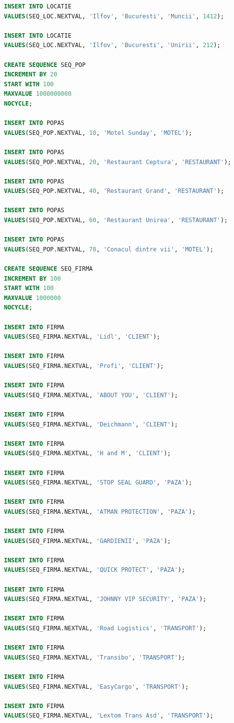 \documentclass[12pt, a4paper]{article}
\begin{document}
\begin{lstlisting}[language=SQL]
INSERT INTO LOCATIE
VALUES(SEQ_LOC.NEXTVAL, 'Ilfov', 'Bucuresti', 'Muncii', 1412);

INSERT INTO LOCATIE
VALUES(SEQ_LOC.NEXTVAL, 'Ilfov', 'Bucuresti', 'Unirii', 212);

CREATE SEQUENCE SEQ_POP
INCREMENT BY 20
START WITH 100
MAXVALUE 1000000000
NOCYCLE;

INSERT INTO POPAS
VALUES(SEQ_POP.NEXTVAL, 10, 'Motel Sunday', 'MOTEL');

INSERT INTO POPAS
VALUES(SEQ_POP.NEXTVAL, 20, 'Restaurant Ceptura', 'RESTAURANT');

INSERT INTO POPAS
VALUES(SEQ_POP.NEXTVAL, 40, 'Restaurant Grand', 'RESTAURANT');

INSERT INTO POPAS
VALUES(SEQ_POP.NEXTVAL, 60, 'Restaurant Unirea', 'RESTAURANT');

INSERT INTO POPAS
VALUES(SEQ_POP.NEXTVAL, 70, 'Conacul dintre vii', 'MOTEL');

CREATE SEQUENCE SEQ_FIRMA
INCREMENT BY 100
START WITH 100
MAXVALUE 1000000
NOCYCLE;

INSERT INTO FIRMA
VALUES(SEQ_FIRMA.NEXTVAL, 'Lidl', 'CLIENT');

INSERT INTO FIRMA
VALUES(SEQ_FIRMA.NEXTVAL, 'Profi', 'CLIENT');

INSERT INTO FIRMA
VALUES(SEQ_FIRMA.NEXTVAL, 'ABOUT YOU', 'CLIENT');

INSERT INTO FIRMA
VALUES(SEQ_FIRMA.NEXTVAL, 'Deichmann', 'CLIENT');

INSERT INTO FIRMA
VALUES(SEQ_FIRMA.NEXTVAL, 'H and M', 'CLIENT');

INSERT INTO FIRMA
VALUES(SEQ_FIRMA.NEXTVAL, 'STOP SEAL GUARD', 'PAZA');

INSERT INTO FIRMA
VALUES(SEQ_FIRMA.NEXTVAL, 'ATMAN PROTECTION', 'PAZA');

INSERT INTO FIRMA
VALUES(SEQ_FIRMA.NEXTVAL, 'GARDIENII', 'PAZA');

INSERT INTO FIRMA
VALUES(SEQ_FIRMA.NEXTVAL, 'QUICK PROTECT', 'PAZA');

INSERT INTO FIRMA
VALUES(SEQ_FIRMA.NEXTVAL, 'JOHNNY VIP SECURITY', 'PAZA');

INSERT INTO FIRMA
VALUES(SEQ_FIRMA.NEXTVAL, 'Road Logistics', 'TRANSPORT');

INSERT INTO FIRMA
VALUES(SEQ_FIRMA.NEXTVAL, 'Transibo', 'TRANSPORT');

INSERT INTO FIRMA
VALUES(SEQ_FIRMA.NEXTVAL, 'EasyCargo', 'TRANSPORT');

INSERT INTO FIRMA
VALUES(SEQ_FIRMA.NEXTVAL, 'Lextom Trans Asd', 'TRANSPORT');


\end{lstlisting}
\end{document}
